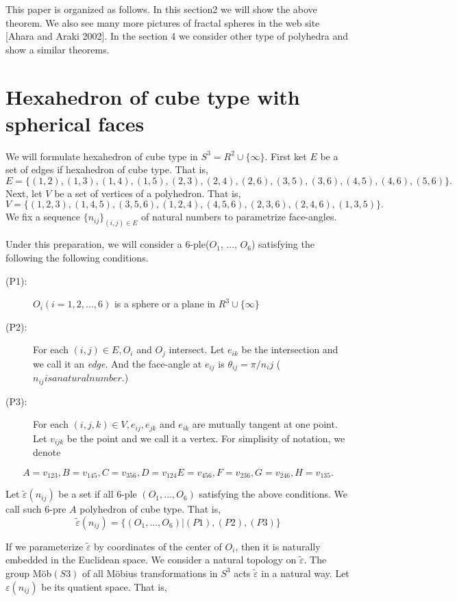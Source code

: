\documentclass[dvipdfmx]{interact}
\theoremstyle{plain}%
\theoremstyle{definition}
\theoremstyle{remark}
\theoremstyle{problemstyle}
\begin{document}
This paper is organized as follows. In this section2 we will show the
above theorem. We also see many more pictures of fractal spheres in the
web site [Ahara and Araki 2002]. In the section 4 we consider other type
of polyhedra and show a similar theorems.
\section{Hexahedron of cube type with spherical faces}
We will formulate hexahedron of cube type in $S^3 = R^2 \cup \{\infty\}$.
First ket $E$ be a set of edges if hexahedron of cube type. That is,
$$
E = \{(1, 2), (1, 3), (1, 4), (1, 5), (2, 3), (2, 4), (2, 6), (3, 5),
(3, 6), (4, 5), (4, 6), (5, 6)\}.
$$
Next, let $V$ be a set of vertices of a polyhedron. That is,
$$
V = \{(1, 2, 3), (1, 4, 5), (3, 5, 6), (1, 2, 4), (4, 5, 6), (2, 3, 6),
(2, 4, 6), (1, 3, 5)\}.
$$
We fix a sequence $\{n_{ij}\}_{(i,j) \in E}$ of natural numbers to
parametrize face-angles.

Under this preparation, we will consider a 6-ple($O_1$, ..., $O_6$)
satisfying the following the following conditions.

\begin{description}
 \item[(P1):] $O_i(i = 1, 2, ..., 6)$ is a sphere or a plane in $R^3
            \cup \{\infty\}$
 \item[(P2):] For each $(i, j) \in E, O_i$ and $O_j$ intersect. Let
            $e_{ik}$ be the intersection and we call it an
            \textit{edge}. And the face-angle at $e_{ij}$ is
            $\theta_{ij} = \pi/n_ij$ ($n_{ij} is a natural number.$)
 \item[(P3):] For each $(i, j, k) \in V, e_{ij}, e_{jk}$ and $e_{ik}$
            are mutually tangent at one point. Let $v_{ijk}$ be 
            the point and we call it a vertex. For simplisity of
            notation, we denote
\end{description}
$$
A = v_{123}, B=v_{145}, C = v_{356}, D = v_{124}
E = v_{456}, F=v_{236}, G = v_{246}, H = v_{135}.
$$

Let $\tilde\varepsilon(n_{ij})$ be a set if all 6-ple $(O_1, ..., O_6)$
satisfying the above conditions. We call such 6-pre $A$ polyhedron of
cube type. That is,
$$
\tilde\varepsilon(n_{ij}) = \{(O_1, ..., O_6) | (P1), (P2), (P3)\}
$$

If we parameterize $\tilde\varepsilon$ by coordinates of the center of
$O_i$, then it is naturally embedded in the Euclidean space. We consider
a natural topology on $\tilde\varepsilon$. The group M\"ob$(S3)$ of all
M\"obius transformations in $S^3$ acts $\tilde\varepsilon$ in a natural way.
Let $\varepsilon(n_{ij})$ be its quatient space. That is,
\end{document}

